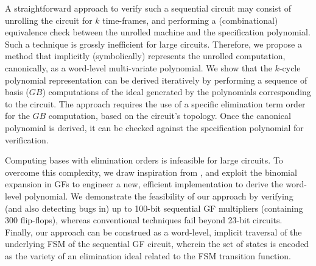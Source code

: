 A straightforward approach to verify such a sequential circuit may
consist of unrolling the circuit for $k$ time-frames, and performing a
(combinational) equivalence check between the unrolled machine and the
specification polynomial. Such a technique is grossly inefficient for
large circuits. Therefore, we propose a method that implicitly
(symbolically) represents the unrolled computation, { canonically,
  as a word-level multi-variate polynomial.} We show that the
$k$-cycle polynomial representation can be derived { iteratively}
by performing a sequence of \Grobner basis ($GB$) computations of the
ideal generated by the polynomials corresponding to the circuit. The
approach  requires the use of a specific elimination term order for
the $GB$ computation, based on the circuit's topology. Once the
canonical polynomial is derived, it can be checked against the
specification polynomial for verification.  

Computing \Grobner bases with elimination orders is infeasible for
large circuits. To overcome this complexity, we draw inspiration from
\cite{pruss:dac14}, and exploit the binomial expansion in GFs to
engineer a new, efficient implementation to derive the word-level
polynomial. We demonstrate the feasibility of our approach by
verifying (and also detecting bugs in) up to 100-bit sequential GF
multipliers (containing 300 flip-flops), whereas conventional
techniques fail beyond 23-bit circuits. Finally, our approach can be
construed as a word-level, implicit traversal of the underlying FSM of
the sequential GF circuit, wherein the set of states is encoded as the
variety of an elimination ideal related to the FSM transition
function.  

